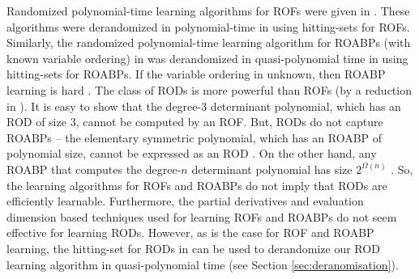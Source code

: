 \documentclass[11pt,letterpaper]{article}
\begin{document}
{{{Randomized polynomial-time learning algorithms for ROFs were given in \cite{HancockH91, BshoutyHH95}. These algorithms were derandomized in polynomial-time in \cite{ShpilkaV14, MinahanV18} using hitting-sets for ROFs. Similarly, the randomized polynomial-time learning algorithm for ROABPs (with known variable ordering) in \cite{BeimelBBKV00, KlivansS06} was derandomized in quasi-polynomial time in \cite{ForbesS13} using hitting-sets for ROABPs. If the variable ordering in unknown, then ROABP learning is hard \cite{BDGT24}. The class of RODs is more powerful than ROFs (by a reduction in \cite{Valiant79a}). It is easy to show that the degree-$3$ determinant polynomial, which has an ROD of size $3$, cannot be computed by an ROF. But, RODs do not capture ROABPs -- the elementary symmetric polynomial, which has an ROABP of polynomial size, cannot be expressed as an ROD \cite{AravindJ15}. On the other hand, any ROABP that computes the degree-$n$ determinant polynomial has size $2^{\Omega(n)}$ \cite{Nisan91}. So, the learning algorithms for ROFs and ROABPs do not imply that RODs are efficiently learnable. Furthermore, the partial derivatives and evaluation dimension based techniques used for learning ROFs and ROABPs do not seem effective for learning RODs. However, as is the case for ROF and ROABP learning, the hitting-set for RODs in \cite{DBLP:conf/stoc/GurjarT17} can be used to derandomize our ROD learning algorithm in quasi-polynomial time (see Section \ref{sec:deranomisation}).

}}}
\end{document}
